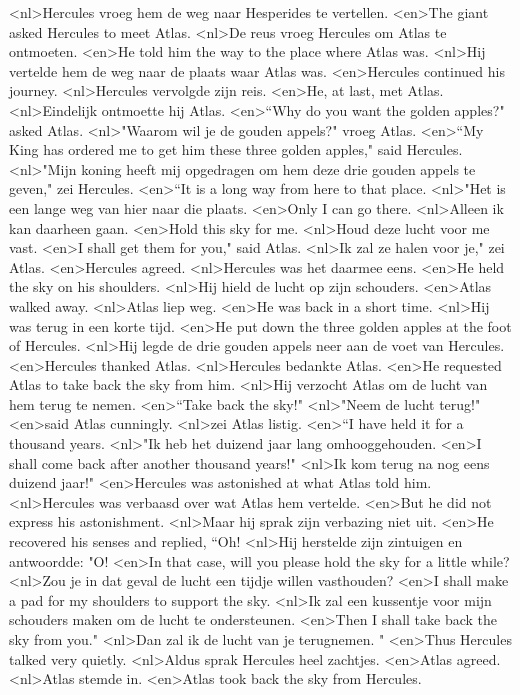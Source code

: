 <nl>Hercules vroeg hem de weg naar Hesperides te vertellen.
<en>The giant asked Hercules to meet Atlas.
<nl>De reus vroeg Hercules om Atlas te ontmoeten.
<en>He told him the way to the place where Atlas was.
<nl>Hij vertelde hem de weg naar de plaats waar Atlas was.
<en>Hercules continued his journey.
<nl>Hercules vervolgde zijn reis.
<en>He, at last, met Atlas.
<nl>Eindelijk ontmoette hij Atlas.
<en>“Why do you want the golden apples?" asked Atlas.
<nl>"Waarom wil je de gouden appels?" vroeg Atlas.
<en>“My King has ordered me to get him these three golden apples," said Hercules.
<nl>"Mijn koning heeft mij opgedragen om hem deze drie gouden appels te geven," zei Hercules.
<en>“It is a long way from here to that place.
<nl>"Het is een lange weg van hier naar die plaats.
<en>Only I can go there.
<nl>Alleen ik kan daarheen gaan.
<en>Hold this sky for me.
<nl>Houd deze lucht voor me vast.
<en>I shall get them for you," said Atlas.
<nl>Ik zal ze halen voor je," zei Atlas.
<en>Hercules agreed.
<nl>Hercules was het daarmee eens.
<en>He held the sky on his shoulders.
<nl>Hij hield de lucht op zijn schouders.
<en>Atlas walked away.
<nl>Atlas liep weg.
<en>He was back in a short time.
<nl>Hij was terug in een korte tijd.
<en>He put down the three golden apples at the foot of Hercules.
<nl>Hij legde de drie gouden appels neer aan de voet van Hercules.
<en>Hercules thanked Atlas.
<nl>Hercules bedankte Atlas.
<en>He requested Atlas to take back the sky from him.
<nl>Hij verzocht Atlas om de lucht van hem terug te nemen.
<en>“Take back the sky!"
<nl>"Neem de lucht terug!"
<en>said Atlas cunningly.
<nl>zei Atlas listig.
<en>“I have held it for a thousand years.
<nl>"Ik heb het duizend jaar lang omhooggehouden.
<en>I shall come back after another thousand years!"
<nl>Ik kom terug na nog eens duizend jaar!"
<en>Hercules was astonished at what Atlas told him.
<nl>Hercules was verbaasd over wat Atlas hem vertelde.
<en>But he did not express his astonishment.
<nl>Maar hij sprak zijn verbazing niet uit.
<en>He recovered his senses and replied, “Oh!
<nl>Hij herstelde zijn zintuigen en antwoordde: "O!
<en>In that case, will you please hold the sky for a little while?
<nl>Zou je in dat geval de lucht een tijdje willen vasthouden?
<en>I shall make a pad for my shoulders to support the sky.
<nl>Ik zal een kussentje voor mijn schouders maken om de lucht te ondersteunen.
<en>Then I shall take back the sky from you."
<nl>Dan zal ik de lucht van je terugnemen. "
<en>Thus Hercules talked very quietly.
<nl>Aldus sprak Hercules heel zachtjes.
<en>Atlas agreed.
<nl>Atlas stemde in.
<en>Atlas took back the sky from Hercules.
